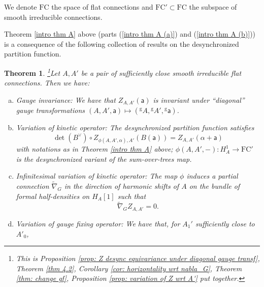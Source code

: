 \documentclass[11pt,a4paper]{amsart}
\theoremstyle{plain} %
\newtheorem{thm}{Theorem}[section]
\theoremstyle{definition}
\theoremstyle{remark}
\newcommand{\sfa}{\mathsf{a}}
\newcommand{\ra}{\rightarrow}
\newcommand{\FC}{\mathrm{FC}}
\newcommand{\sfg}{\mathrm{g}} %
\begin{document}

We denote $\FC$ the space of flat connections and $\FC'\subset \FC$ the subspace of smooth irreducible connections.

Theorem \ref{intro thm A} above (parts (\ref{intro thm A (a)}) and (\ref{intro thm A (b)})) is a consequence of the following collection of results on the desynchronized partition function. 
\begin{thm}\footnote{
This is Proposition \ref{prop: Z desync equivariance under diagonal gauge transf}, Theorem \ref{thm 4.2}, Corollary \ref{cor: horizontality wrt nabla_G}, Theorem \ref{thm: change gf}, Proposition \ref{prop: variation of Z wrt A'} put together.
}\label{thm: intro desy Z}
Let $A,A'$ be a pair of sufficiently close smooth irreducible flat connections. Then we have:
    \begin{enumerate}[a)]
    \item \emph{Gauge invariance:} We have that $Z_{A,A'}(\sfa)$ is invariant under ``diagonal'' gauge transformations $(A,A',\sfa) \mapsto ({}^\sfg A,{}^\sfg A',{}^\sfg\sfa)$. 
        \item \emph{Variation of kinetic operator:} The desynchronized partition function satisfies 
        \begin{equation}
            \det(B^\vee) \circ Z_{\phi(A,A',\alpha),A'}(B(\sfa)) = Z_{A,A'}(\alpha + \sfa) \label{eq: thm desy Z intro 1}
        \end{equation}
        with notations as in Theorem \ref{intro thm A} above;  $\phi(A,A',-)\colon H_A^1\ra \FC'$ is the desynchronized variant of the sum-over-trees map.
        \item \emph{Infinitesimal variation of kinetic operator:} The %
        map $\phi$
        induces a partial connection $\widetilde{\nabla}_G$ in the direction of harmonic shifts of $A$ on the %
         bundle of formal half-densities on $H_{A}[1]$
        such that 
        \begin{equation}\label{intro til nabla^G horizontality}
            \widetilde{\nabla}_GZ_{A,A'} = 0. 
        \end{equation}
        \item \emph{Variation of gauge fixing operator:}  We have that, for $A_1'$ sufficiently close to $A'_0$, %

\end{enumerate}
\end{thm}
\end{document}
